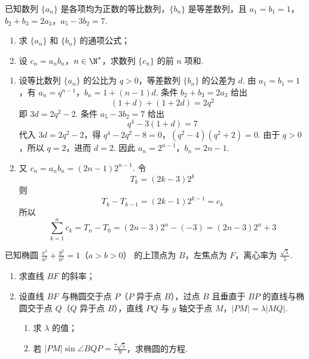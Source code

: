 \begin{problem}
已知数列 \(\{a_{n}\}\) 是各项均为正数的等比数列，\(\{b_{n}\}\) 是等差数列，且 \(a_{1} = b_{1} = 1\)，\(b_{2} + b_{3} = 2a_{3}\)，\(a_{5} - 3b_{2} = 7\).
\begin{enumerate}
\item 求 \( \{a_{n}\} \) 和 \( \{b_{n}\} \) 的通项公式；
\item 设 \(c_{n} = a_{n}b_{n}\)，\(n \in \N^{*}\)，求数列 \(\{c_{n}\}\) 的前 \(n\) 项和.
\end{enumerate}
\end{problem}

\begin{solution}
\begin{enumerate}
\item 设等比数列 \(\{a_n\}\) 的公比为 \(q>0\)，等差数列 \(\{b_n\}\) 的公差为 \(d\). 由 \(a_1=b_1=1\)，有
\(a_n=q^{n-1}\)，\(b_n=1+(n-1)d\).
条件 \(b_2+b_3=2a_3\) 给出
\[
(1+d)+(1+2d)=2q^2
\]
即 \(3d=2q^2-2\). 条件 \(a_5-3b_2=7\) 给出
\[
q^4-3(1+d)=7
\]
代入 \(3d=2q^2-2\)，得
\(q^4-2q^2-8=0\)，\((q^2-4)(q^2+2)=0\).
由于 \(q>0\)，所以 \(q=2\)，进而 \(d=2\). 因此
\(a_n=2^{n-1}\)，\(b_n=2n-1\).

\item 又 \(c_n=a_nb_n=(2n-1)2^{n-1}\). 令
\[
T_k=(2k-3)2^k
\]
则
\[
T_k-T_{k-1}=(2k-1)2^{k-1}=c_k
\]
所以
\[
\sum_{k=1}^n c_k=T_n-T_0=(2n-3)2^n-(-3)=(2n-3)2^n+3
\]
\end{enumerate}
\end{solution}

\begin{problem}
已知椭圆 \(\frac{x^2}{a^2} + \frac{y^2}{b^2} = 1\)（\(a > b > 0\)） 的上顶点为 \(B\)，左焦点为 \(F\)，离心率为 \(\frac{\sqrt{5}}{5}\).
\begin{enumerate}
\item 求直线 \(BF\) 的斜率；
\item 设直线 \(BF\) 与椭圆交于点 \(P\)（\(P\) 异于点 \(B\)），过点 \(B\) 且垂直于 \(BP\) 的直线与椭圆交于点 \(Q\)（\(Q\) 异于点 \(B\)），直线 \(PQ\) 与 \(y\) 轴交于点 \(M\)，\( |PM| = \lambda |MQ| \).
\begin{enumerate}
\item 求 \( \lambda \) 的值；
\item 若 \( |PM| \sin \angle BQP = \frac{7\sqrt{5}}{9} \)，求椭圆的方程.
\end{enumerate}
\end{enumerate}
\end{problem}


